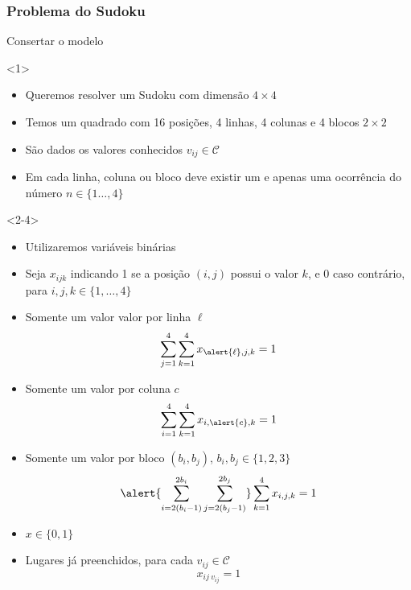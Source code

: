\documentclass[10pt]{beamer}
\begin{document}
\begin{frame}
  \frametitle{Problema do Sudoku}

\alert{\huge Consertar o modelo}
  
  \begin{onlyenv}<1>
    \begin{itemize}
    \item Queremos resolver um Sudoku com dimensão $4 \times 4$
    \item Temos um quadrado com 16 posições, 4 linhas, 4 colunas e 4
      blocos $2 \times 2$
    \item São dados os valores conhecidos $v_{ij} \in \mathcal{C}$
    \item Em cada linha, coluna ou bloco deve existir um e apenas uma
      ocorrência do número $n \in \{1 \dots, 4\}$
    \end{itemize}
  \end{onlyenv}

  \begin{onlyenv}<2-4>
    \begin{itemize}
    \item<only@2> Utilizaremos variáveis binárias
    \item<only@2> Seja $x_{ijk}$ indicando 1 se a posição $(i, j)$ possui o
      valor $k$, e 0 caso contrário, para $i, j, k \in \{1, \dots, 4\}$
    \item<only@3> Somente um valor valor por linha $\ell$
      \[
        \sum_{j = 1}^4 \sum_{k = 1}^4 x_{\alert{\ell}, j, k} = 1
      \]
    \item<only@3> Somente um valor por coluna $c$
      \[
        \sum_{i = 1}^4 \sum_{k = 1}^4 x_{i, \alert{c}, k} = 1
      \]
    \item<only@3> Somente um valor por bloco $(b_i, b_j)$, $b_i, b_j \in \{1, 2, 3\}$
      \[
        \alert{\sum_{i = 2(b_i - 1)}^{2b_i} \sum_{j = 2(b_j - 1)}^{2b_j}} \sum_{k = 1}^4 x_{i, j, k} = 1
      \]
    \item<only@4> $x \in \{0, 1\}$

    \item<only@4> Lugares já preenchidos, para cada
      $v_{ij} \in \mathcal{C}$
      \[
        x_{ij\ v_{ij}} = 1
      \]
    \end{itemize}
  \end{onlyenv}

\end{frame}
\end{document}
